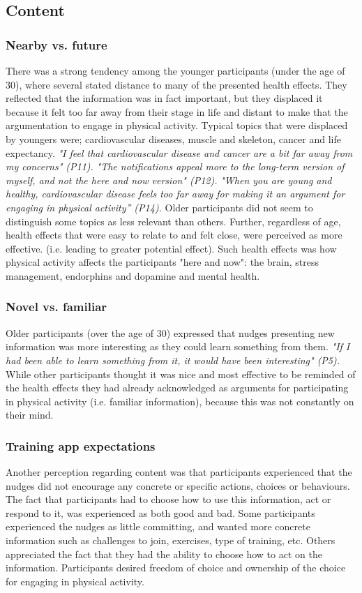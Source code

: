 \subsection{Content}
\subsubsection{Nearby vs. future}
There was a strong tendency among the younger participants (under the age of 30), where several stated distance to many of the presented health effects. They reflected that the information was in fact important, but they displaced it because it felt too far away from their stage in life and distant to make that the argumentation to engage in physical activity. Typical topics that were displaced by youngers were; cardiovascular diseases, muscle and skeleton, cancer and life expectancy. 
\textit{"I feel that cardiovascular disease and cancer are a bit far away from my concerns" (P11).}
\textit{"The notifications appeal more to the long-term version of myself, and not the here and now version" (P12).}
\textit{"When you are young and healthy, cardiovascular disease feels too far away for making it an argument for engaging in physical activity” (P14).} 
Older participants did not seem to distinguish some topics as less relevant than others. Further, regardless of age, health effects that were easy to relate to and felt close, were perceived as more effective. (i.e. leading to greater potential effect). Such health effects was how physical activity affects the participants "here and now": the brain, stress management, endorphins and dopamine and mental health. 

\subsubsection{Novel vs. familiar}
Older participants (over the age of 30) expressed that nudges presenting new information was more interesting as they could learn something from them. \textit{"If I had been able to learn something from it, it would have been interesting" (P5).}
While other participants thought it was nice and most effective to be reminded of the health effects they had already acknowledged as arguments for participating in physical activity (i.e. familiar information), because this was not constantly on their mind. 

\subsubsection{Training app expectations}
Another perception regarding content was that participants experienced that the nudges did not encourage any concrete or specific actions, choices or behaviours. The fact that participants had to choose how to use this information, act or respond to it, was experienced as both good and bad. Some participants experienced the nudges as little committing, and wanted more concrete information such as challenges to join, exercises, type of training, etc. Others appreciated the fact that they had the ability to choose how to act on the information. Participants desired freedom of choice and ownership of the choice for engaging in physical activity. 

